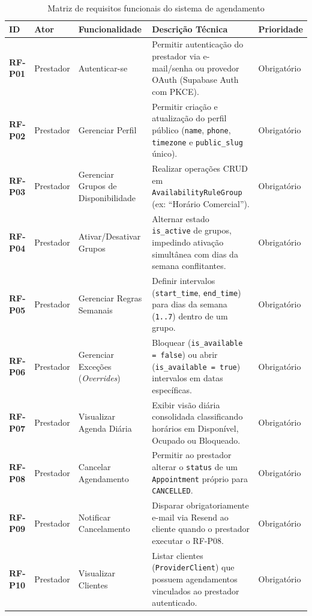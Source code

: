 \documentclass[12pt,a4paper]{article}
\begin{document}
\begin{table}[hbt]
\centering
\caption{Matriz de requisitos funcionais do sistema de agendamento}
\label{quadro:requisitos_funcionais}
\footnotesize
\renewcommand{\arraystretch}{1.2}
\begin{tabularx}{\textwidth}{|l|l|p{3.4cm}|X|l|}
\hline
\textbf{ID} & \textbf{Ator} & \textbf{Funcionalidade} & \textbf{Descrição Técnica} & \textbf{Prioridade} \\ \hline
\textbf{RF-P01} & Prestador & Autenticar-se & Permitir autenticação do prestador via e-mail/senha ou provedor OAuth (Supabase Auth com PKCE). & Obrigatório \\ \hline
\textbf{RF-P02} & Prestador & Gerenciar Perfil & Permitir criação e atualização do perfil público (\texttt{name}, \texttt{phone}, \texttt{timezone} e \texttt{public\_slug} único). & Obrigatório \\ \hline
\textbf{RF-P03} & Prestador & Gerenciar Grupos de Disponibilidade & Realizar operações CRUD em \texttt{AvailabilityRuleGroup} (ex: ``Horário Comercial''). & Obrigatório \\ \hline
\textbf{RF-P04} & Prestador & Ativar/Desativar Grupos & Alternar estado \texttt{is\_active} de grupos, impedindo ativação simultânea com dias da semana conflitantes. & Obrigatório \\ \hline
\textbf{RF-P05} & Prestador & Gerenciar Regras Semanais & Definir intervalos (\texttt{start\_time}, \texttt{end\_time}) para dias da semana (\texttt{1..7}) dentro de um grupo. & Obrigatório \\ \hline
\textbf{RF-P06} & Prestador & Gerenciar Exceções (\textit{Overrides}) & Bloquear (\texttt{is\_available = false}) ou abrir (\texttt{is\_available = true}) intervalos em datas específicas. & Obrigatório \\ \hline
\textbf{RF-P07} & Prestador & Visualizar Agenda Diária & Exibir visão diária consolidada classificando horários em Disponível, Ocupado ou Bloqueado. & Obrigatório \\ \hline
\textbf{RF-P08} & Prestador & Cancelar Agendamento & Permitir ao prestador alterar o \texttt{status} de um \texttt{Appointment} próprio para \texttt{CANCELLED}. & Obrigatório \\ \hline
\textbf{RF-P09} & Prestador & Notificar Cancelamento & Disparar obrigatoriamente e-mail via Resend ao cliente quando o prestador executar o RF-P08. & Obrigatório \\ \hline
\textbf{RF-P10} & Prestador & Visualizar Clientes & Listar clientes (\texttt{ProviderClient}) que possuem agendamentos vinculados ao prestador autenticado. & Obrigatório \\ \hline

\end{tabularx}
\end{table}
\end{document}
